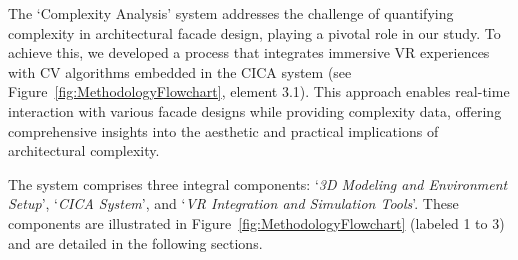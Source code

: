 
The `Complexity Analysis' system addresses the challenge of quantifying complexity in architectural facade design, playing a pivotal role in our study.
To achieve this, we developed a process that integrates immersive VR experiences with CV algorithms embedded in the CICA system (see Figure~\ref{fig:MethodologyFlowchart}, element 3.1).
This approach enables real-time interaction with various facade designs while providing complexity data, offering comprehensive insights into the aesthetic and practical implications of architectural complexity.

The system comprises three integral components: `\textit{3D Modeling and Environment Setup}', `\textit{CICA System}', and `\textit{VR Integration and Simulation Tools}'.
These components are illustrated in Figure~\ref{fig:MethodologyFlowchart} (labeled 1 to 3) and are detailed in the following sections.

%
%
